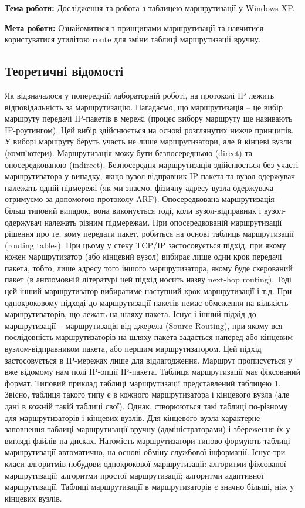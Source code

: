 \documentclass[12pt]{extarticle}
\begin{document}
\textbf{Тема роботи:} Дослідження та робота з таблицею маршрутизації у Windows XP.
\vspace{12pt}

\textbf{Мета роботи:} Ознайомитися з принципами маршрутизації та навчитися користуватися утилітою
route для зміни таблиці маршрутизації вручну.

\subsection*{Теоретичні відомості}
Як відзначалося у попередній лабораторній роботі, на протоколі IP лежить
відповідальність за маршрутизацію. Нагадаємо, що маршрутизація – це вибір маршруту
передачі IP-пакетів в мережі (процес вибору маршруту ще називають IP-роутингом). Цей
вибір здійснюється на основі розглянутих нижче принципів. У виборі маршруту беруть
участь не лише маршрутизатори, але й кінцеві вузли (комп’ютери).
Маршрутизація можу бути безпосередньою (direct) та опосередкованою (indirect).
Безпосередня маршрутизація здійснюється без участі маршрутизатора у випадку, якщо вузол
відправник IP-пакета та вузол-одержувач належать одній підмережі (як ми знаємо, фізичну
адресу вузла-одержувача отримуємо за допомогою протоколу ARP). Опосередкована
маршрутизація – більш типовий випадок, вона виконується тоді, коли вузол-відправник і
вузол-одержувач належать різним підмережам.
При опосередкованій маршрутизації рішення про те, кому передати пакет, робиться
на основі таблиць маршрутизації (routing tables). При цьому у стеку TCP/IP застосовується
підхід, при якому кожен маршрутизатор (або кінцевий вузол) вибирає лише один крок
передачі пакета, тобто, лише адресу того іншого маршрутизатора, якому буде скерований
пакет (в англомовній літературі цей підхід носить назву next-hop routing). Тоді цей інший
маршрутизатор вибиратиме наступний крок маршрутизації і т.д. При однокроковому підході
до маршрутизації пакетів немає обмеження на кількість маршрутизаторів, що лежать на
шляху пакета.
Існує і інший підхід до маршрутизації – маршрутизація від джерела (Source Routing),
при якому вся послідовність маршрутизаторів на шляху пакета задається наперед або
кінцевим вузлом-відправником пакета, або першим маршрутизатором. Цей підхід
застосовується в IP-мережах лише для відлагодження. Маршрут прописується у вже
відомому нам полі IP-опції IP-пакета.
Таблиця маршрутизації має фіксований формат. Типовий приклад таблиці
маршрутизації представлений таблицею 1. Звісно, таблиця такого типу є в кожного
маршрутизатора і кінцевого вузла (але дані в кожній такій таблиці свої). Однак, створюються
такі таблиці по-різному для маршрутизаторів і кінцевих вузлів. Для кінцевого вузла
характерне заповнення таблиці маршрутизації вручну (адміністраторами) і збереження їх у
вигляді файлів на дисках. Натомість маршрутизатори типово формують таблиці
маршрутизації автоматично, на основі обміну службової інформації. Існує три класи
алгоритмів побудови однокрокової маршрутизації: алгоритми фіксованої маршрутизації;
алгоритми простої маршрутизації; алгоритми адаптивної маршрутизації.
Таблиці маршрутизації в маршрутизаторів є значно більші, ніж у кінцевих вузлів.
\end{document}
